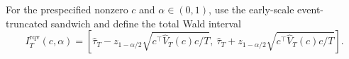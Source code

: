 For the prespecified nonzero \(c\) and \(\alpha\in(0,1)\), use the early-scale event-truncated sandwich and define the total Wald interval
\[
 I_T^{\mathrm{rqv}}(c,\alpha)=
 \left[\widehat\tau_T-z_{1-\alpha/2}
 \sqrt{c^\top\widehat V_T(c)c/T},\ 
 \widehat\tau_T+z_{1-\alpha/2}
 \sqrt{c^\top\widehat V_T(c)c/T}\right].
\]